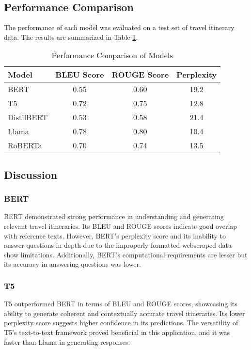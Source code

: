 \documentclass[conference]{IEEEtran}
\begin{document}
\subsection{Performance Comparison}

The performance of each model was evaluated on a test set of travel itinerary data. The results are summarized in Table \ref{tab:results}.

\begin{table}[htbp]
\caption{Performance Comparison of Models}
\centering
\begin{tabular}{|l|c|c|c|}
\hline
\textbf{Model} & \textbf{BLEU Score} & \textbf{ROUGE Score} & \textbf{Perplexity} \\
\hline
BERT & 0.55 & 0.60 & 19.2 \\
T5 & 0.72 & 0.75 & 12.8 \\
DistilBERT & 0.53 & 0.58 & 21.4 \\
Llama & 0.78 & 0.80 & 10.4 \\
RoBERTa & 0.70 & 0.74 & 13.5 \\
\hline
\end{tabular}
\label{tab:results}
\end{table}

\subsection{Discussion}

\subsubsection{BERT}

BERT demonstrated strong performance in understanding and generating relevant travel itineraries. Its BLEU and ROUGE scores indicate good overlap with reference texts. However, BERT's perplexity score and its inability to answer questions in depth due to the improperly formatted webscraped data show limitations. Additionally, BERT's computational requirements are lesser but its accuracy in answering questions was lower.

\subsubsection{T5}

T5 outperformed BERT in terms of BLEU and ROUGE scores, showcasing its ability to generate coherent and contextually accurate travel itineraries. Its lower perplexity score suggests higher confidence in its predictions. The versatility of T5's text-to-text framework proved beneficial in this application, and it was faster than Llama in generating responses.
\end{document}
